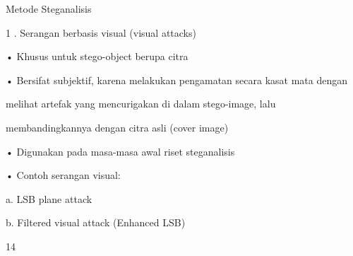 \documentclass{article}
\begin{document}

Metode Steganalisis

1 . Serangan berbasis visual (visual attacks) 

• Khusus untuk stego-object berupa citra

• Bersifat subjektif, karena melakukan pengamatan  secara kasat mata dengan 

melihat artefak yang mencurigakan di dalam stego-image, lalu 

membandingkannya dengan citra asli (cover image)

• Digunakan pada masa-masa awal riset steganalisis     

• Contoh serangan visual: 


   a. LSB plane attack


   b. Filtered visual attack (Enhanced LSB)  

14
\end{document}
